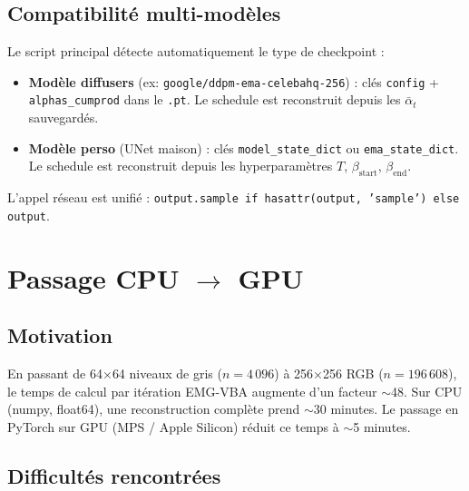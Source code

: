 \documentclass[12pt]{article}
\begin{document}
\subsection{Compatibilité multi-modèles}

Le script principal détecte automatiquement le type de checkpoint :
\begin{itemize}
    \item \textbf{Modèle diffusers} (ex: \texttt{google/ddpm-ema-celebahq-256}) : clés \texttt{config} + \texttt{alphas\_cumprod} dans le \texttt{.pt}. Le schedule est reconstruit depuis les $\bar\alpha_t$ sauvegardés.
    \item \textbf{Modèle perso} (UNet maison) : clés \texttt{model\_state\_dict} ou \texttt{ema\_state\_dict}. Le schedule est reconstruit depuis les hyperparamètres $T$, $\beta_{\text{start}}$, $\beta_{\text{end}}$.
\end{itemize}
L'appel réseau est unifié : \texttt{output.sample if hasattr(output, 'sample') else output}.

\section{Passage CPU $\to$ GPU}

\subsection{Motivation}

En passant de 64$\times$64 niveaux de gris ($n = 4\,096$) à 256$\times$256 RGB ($n = 196\,608$), le temps de calcul par itération EMG-VBA augmente d'un facteur $\sim$48. Sur CPU (numpy, float64), une reconstruction complète prend $\sim$30 minutes. Le passage en PyTorch sur GPU (MPS / Apple Silicon) réduit ce temps à $\sim$5 minutes.

\subsection{Difficultés rencontrées}
\end{document}
